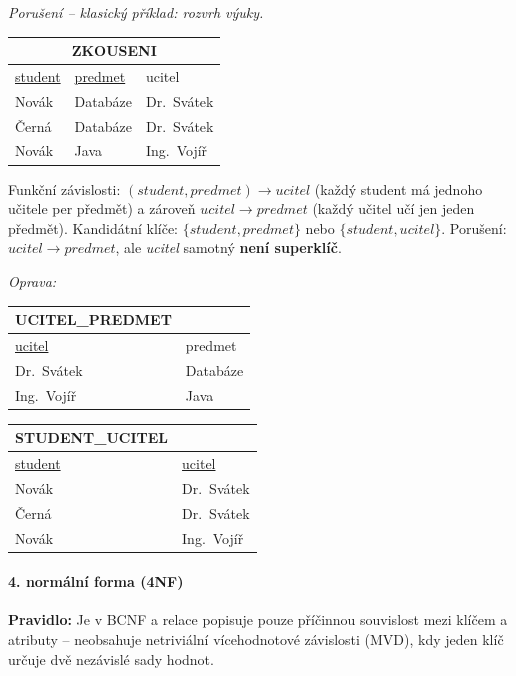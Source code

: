 \smallskip
\textit{Porušení -- klasický příklad: rozvrh výuky.}
\begin{center}\footnotesize
\begin{tabular}{lll}
\toprule
\multicolumn{3}{c}{\textbf{ZKOUSENI}} \\
\midrule
\underline{student} & \underline{predmet} & ucitel \\
\midrule
Novák & Databáze & Dr.~Svátek \\
Černá & Databáze & Dr.~Svátek \\
Novák & Java & Ing.~Vojíř \\
\bottomrule
\end{tabular}
\end{center}

Funkční závislosti: $(student, predmet) \to ucitel$ (každý student má jednoho učitele per předmět)
a zároveň $ucitel \to predmet$ (každý učitel učí jen jeden předmět).
Kandidátní klíče: $\{student, predmet\}$ nebo $\{student, ucitel\}$.
Porušení: $ucitel \to predmet$, ale \textit{ucitel} samotný \textbf{není superklíč}.

\textit{Oprava:}
\begin{center}\footnotesize
\begin{tabular}{ll}
\toprule\textbf{UCITEL\_PREDMET}\\\midrule
\underline{ucitel} & predmet \\\midrule
Dr.~Svátek & Databáze \\
Ing.~Vojíř & Java \\
\bottomrule
\end{tabular}
\quad
\begin{tabular}{ll}
\toprule\textbf{STUDENT\_UCITEL}\\\midrule
\underline{student} & \underline{ucitel}\\\midrule
Novák & Dr.~Svátek \\
Černá & Dr.~Svátek \\
Novák & Ing.~Vojíř \\
\bottomrule
\end{tabular}
\end{center}

\paragraph{4. normální forma (4NF)}
\textbf{Pravidlo:} Je v BCNF a relace popisuje pouze příčinnou souvislost mezi klíčem a atributy -- neobsahuje netriviální vícehodnotové závislosti (MVD), kdy jeden klíč určuje dvě nezávislé sady hodnot.

